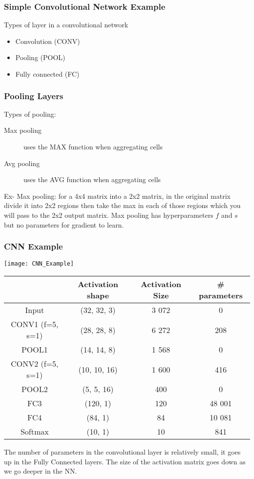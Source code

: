 \subsubsection{Simple Convolutional Network Example}
Types of layer in a convolutional network
\begin{itemize}
    \item Convolution (CONV)
    \item Pooling (POOL)
    \item Fully connected (FC)
\end{itemize}


\subsubsection{Pooling Layers}
Types of pooling:
\begin{description}
    \item[Max pooling] uses the MAX function when aggregating cells
    \item[Avg pooling] uses the AVG function when aggregating cells
\end{description}
Ex- Max pooling: for a 4x4 matrix into a 2x2 matrix, in the original matrix divide it into 2x2 regions then take the max in each of those regions which you will pass to the 2x2 output matrix.
Max pooling has hyperparameters $f$ and $s$ but no parameters for gradient to learn.

\subsubsection{CNN Example}
\texttt{[image: CNN\_Example]}
\begin{center}
\begin{tabular}{ |c|c|c|c| }
 \hline
 & Activation shape & Activation Size & \# parameters \\
 \hline
 Input & (32, 32, 3) & 3 072 & 0 \\
 \hline
 CONV1 (f=5, s=1)& (28, 28, 8) & 6 272 & 208 \\
 \hline
 POOL1 & (14, 14, 8) & 1 568 & 0 \\
 \hline
 CONV2 (f=5, s=1) & (10, 10, 16) & 1 600 & 416 \\
 \hline
 POOL2 & (5, 5, 16) & 400 & 0 \\
 \hline
 FC3 & (120, 1) & 120 & 48 001 \\
 \hline
 FC4 & (84, 1) & 84 & 10 081 \\
 \hline
 Softmax & (10, 1) & 10 & 841 \\
 \hline
\end{tabular}
\end{center}
The number of parameters in the convolutional layer is relatively small, it goes up in the Fully Connected layers. The size of the activation matrix goes down as we go deeper in the NN.

